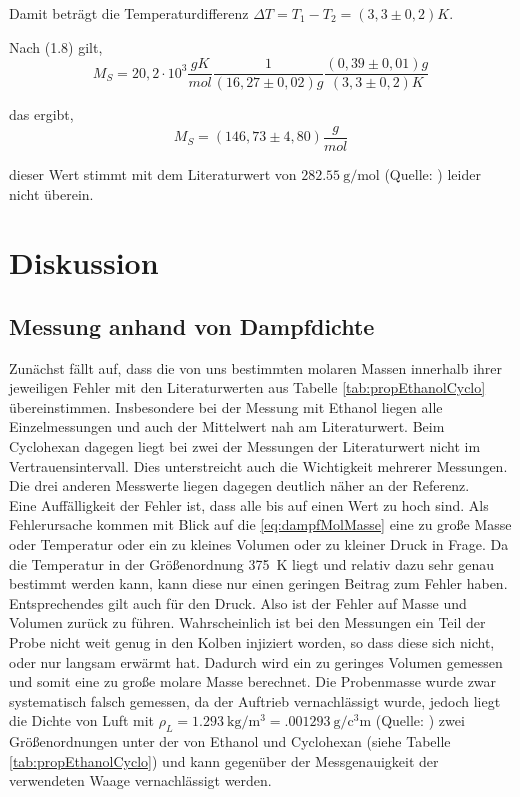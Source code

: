Damit beträgt die Temperaturdifferenz $\Delta T=T_{1}-T_{2}=\left(3,3\pm0,2\right)K$.

Nach (1.8) gilt,
\[
M_{S}=20,2\cdot10^{3}\frac{gK}{mol}\frac{1}{\left(16,27\pm0,02\right)g}\frac{\left(0,39\pm0,01\right)g}{\left(3,3\pm0,2\right)K}
\]


das ergibt,
\[
M_{S}=\left(146,73\pm4,80\right)\frac{g}{mol}
\]


dieser Wert stimmt mit dem Literaturwert von $\SI{282.55}{\g\per\mol}$ (Quelle: \cite{wiki:alkane})
leider nicht überein. 

\section{Diskussion} %
\subsection{Messung anhand von Dampfdichte}
Zunächst fällt auf, dass die von uns bestimmten molaren Massen innerhalb ihrer jeweiligen Fehler mit den Literaturwerten aus Tabelle \ref{tab:propEthanolCyclo} übereinstimmen. Insbesondere bei der Messung mit Ethanol liegen alle Einzelmessungen und auch der Mittelwert nah am Literaturwert. Beim Cyclohexan dagegen liegt bei zwei der Messungen der Literaturwert nicht im Vertrauensintervall. Dies unterstreicht auch die Wichtigkeit mehrerer Messungen. Die drei anderen Messwerte liegen dagegen deutlich näher an der Referenz.\\
Eine Auffälligkeit der Fehler ist, dass alle bis auf einen Wert zu hoch sind. Als Fehlerursache kommen mit Blick auf die \eqref{eq:dampfMolMasse} eine zu große Masse oder Temperatur oder ein zu kleines Volumen oder zu kleiner Druck in Frage. Da die Temperatur in der Größenordnung \SI{375}{\K} liegt und relativ dazu sehr genau bestimmt werden kann, kann diese nur einen geringen Beitrag zum Fehler haben. Entsprechendes gilt auch für den Druck.
Also ist der Fehler auf Masse und Volumen zurück zu führen. Wahrscheinlich ist bei den Messungen ein Teil der Probe nicht weit genug in den Kolben injiziert worden, so dass diese sich nicht, oder nur langsam erwärmt hat. Dadurch wird ein zu geringes Volumen gemessen und somit eine zu große molare Masse berechnet. Die Probenmasse wurde zwar systematisch falsch gemessen, da der Auftrieb vernachlässigt wurde, jedoch liegt die Dichte von Luft mit $ \rho_L = \SI{1,293}{\kilo\g\per\cubic\meter} = \SI{,001293}{\g\per\cubic\centi\m} $ (Quelle: \cite{wiki:luft}) zwei Größenordnungen unter der von Ethanol und Cyclohexan (siehe Tabelle \ref{tab:propEthanolCyclo}) und kann gegenüber der Messgenauigkeit der verwendeten Waage vernachlässigt werden.
